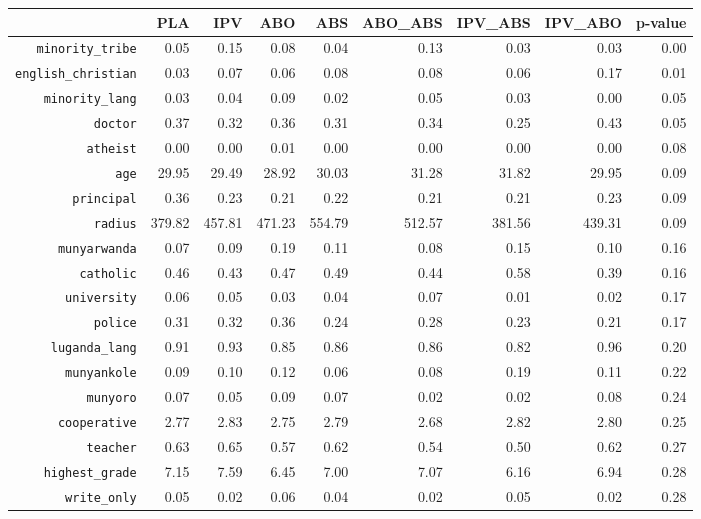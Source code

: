 \begin{longtable}{rrrrrrrrr}
  \hline
 & PLA & IPV & ABO & ABS & ABO\_ABS & IPV\_ABS & IPV\_ABO & p-value \\ 
  \hline
{\texttt{minority\_tribe}} & 0.05 & 0.15 & 0.08 & 0.04 & 0.13 & 0.03 & 0.03 & 0.00 \\ 
  {\texttt{english\_christian}} & 0.03 & 0.07 & 0.06 & 0.08 & 0.08 & 0.06 & 0.17 & 0.01 \\ 
  {\texttt{minority\_lang}} & 0.03 & 0.04 & 0.09 & 0.02 & 0.05 & 0.03 & 0.00 & 0.05 \\ 
  {\texttt{doctor}} & 0.37 & 0.32 & 0.36 & 0.31 & 0.34 & 0.25 & 0.43 & 0.05 \\ 
  {\texttt{atheist}} & 0.00 & 0.00 & 0.01 & 0.00 & 0.00 & 0.00 & 0.00 & 0.08 \\ 
  {\texttt{age}} & 29.95 & 29.49 & 28.92 & 30.03 & 31.28 & 31.82 & 29.95 & 0.09 \\ 
  {\texttt{principal}} & 0.36 & 0.23 & 0.21 & 0.22 & 0.21 & 0.21 & 0.23 & 0.09 \\ 
  {\texttt{radius}} & 379.82 & 457.81 & 471.23 & 554.79 & 512.57 & 381.56 & 439.31 & 0.09 \\ 
  {\texttt{munyarwanda}} & 0.07 & 0.09 & 0.19 & 0.11 & 0.08 & 0.15 & 0.10 & 0.16 \\ 
  {\texttt{catholic}} & 0.46 & 0.43 & 0.47 & 0.49 & 0.44 & 0.58 & 0.39 & 0.16 \\ 
  {\texttt{university}} & 0.06 & 0.05 & 0.03 & 0.04 & 0.07 & 0.01 & 0.02 & 0.17 \\ 
  {\texttt{police}} & 0.31 & 0.32 & 0.36 & 0.24 & 0.28 & 0.23 & 0.21 & 0.17 \\ 
  {\texttt{luganda\_lang}} & 0.91 & 0.93 & 0.85 & 0.86 & 0.86 & 0.82 & 0.96 & 0.20 \\ 
  {\texttt{munyankole}} & 0.09 & 0.10 & 0.12 & 0.06 & 0.08 & 0.19 & 0.11 & 0.22 \\ 
  {\texttt{munyoro}} & 0.07 & 0.05 & 0.09 & 0.07 & 0.02 & 0.02 & 0.08 & 0.24 \\ 
  {\texttt{cooperative}} & 2.77 & 2.83 & 2.75 & 2.79 & 2.68 & 2.82 & 2.80 & 0.25 \\ 
  {\texttt{teacher}} & 0.63 & 0.65 & 0.57 & 0.62 & 0.54 & 0.50 & 0.62 & 0.27 \\ 
  {\texttt{highest\_grade}} & 7.15 & 7.59 & 6.45 & 7.00 & 7.07 & 6.16 & 6.94 & 0.28 \\ 
  {\texttt{write\_only}} & 0.05 & 0.02 & 0.06 & 0.04 & 0.02 & 0.05 & 0.02 & 0.28 \\ 

\end{longtable}
